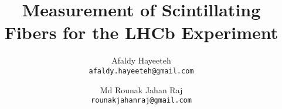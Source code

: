 \title{Measurement of Scintillating Fibers for the LHCb Experiment}


\author{Afaldy Hayeeteh\\ \texttt{afaldy.hayeeteh@gmail.com} \and Md Rounak Jahan Raj \\ \texttt{rounakjahanraj@gmail.com}}




\maketitle

\setcounter{savepage}{\thepage}

